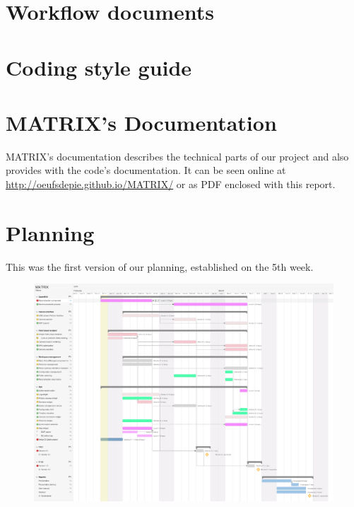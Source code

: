 \documentclass[a4paper]{report}
\begin{document}
\chapter{Workflow documents}
\chapter{Coding style guide}
\chapter{MATRIX's Documentation}

MATRIX's documentation describes the technical parts of our project
and also provides with the code's documentation. It can be seen online
at \url{http://oeufsdepie.github.io/MATRIX/} or as PDF enclosed with
this report.

\chapter{Planning}
\thispagestyle{empty}
This was the first version of our planning, established on 
the 5th week.
\begin{figure}[!htbp]
  \centering
  \includegraphics[width=\linewidth]{img/planning.pdf}
  \label{app:planning}
\end{figure}
\restoregeometry
\end{document}
